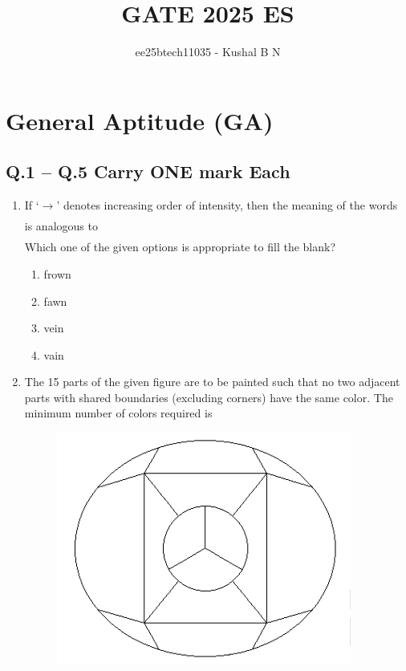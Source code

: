 \documentclass[journal]{IEEEtran}
\title{\textbf{GATE 2025 ES}}
\author{ee25btech11035 - Kushal B N}
\date{}
\begin{document}
\maketitle

\section*{General Aptitude (GA)}

\subsection*{Q.1 -- Q.5 Carry ONE mark Each}

\begin{enumerate}
\item If `$\rightarrow$' denotes increasing order of intensity, then the meaning of the words
\begin{align}
[\text{sick} \rightarrow \text{infirm} \rightarrow \text{moribund}]
\end{align}
is analogous to 
\begin{align}
[\text{silly} \rightarrow \_\_\_\_\_\_ \rightarrow \text{daft}]
\end{align}
Which one of the given options is appropriate to fill the blank?
\hfill{}

\begin{multicols}{2}
\begin{enumerate}
\item frown
\item fawn
\item vein
\item vain
\end{enumerate}
\end{multicols}

\item The 15 parts of the given figure are to be painted such that no two adjacent parts with shared boundaries (excluding corners) have the same color. The minimum number of colors required is
\hfill{}

\begin{figure}[H]
    \centering
    \includegraphics[width=0.5\columnwidth]{figs/fig1.png}
    \label{fig:placeholder}
\end{figure}


\end{enumerate}
\end{document}
